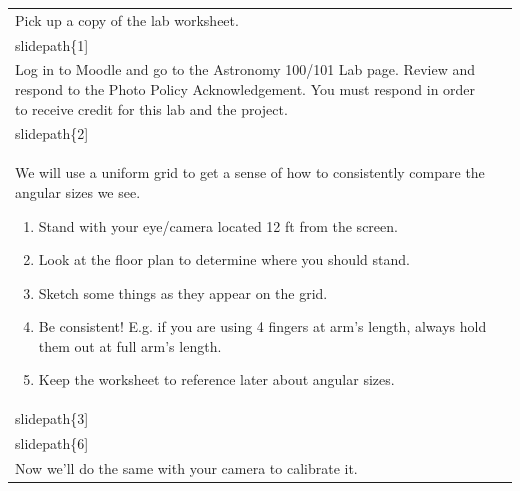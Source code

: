 \documentclass[12pt]{article}
\begin{document}
\begin{longtable}{|m{}|m{}|}\hline
Pick up a copy of the lab worksheet. & \texttt{[image: \\slidepath\{1]}}\\\hline
Log in to Moodle and go to the Astronomy 100/101 Lab page. Review and respond to the Photo Policy Acknowledgement. You must respond in order to receive credit for this lab and the project.& \texttt{[image: \\slidepath\{2]}}\\\hline
We will use a uniform grid to get a sense of how to consistently compare the angular sizes we see. 

\begin{enumerate}
\item Stand with your eye/camera located 12 ft from the screen. 
\item Look at the floor plan to determine where you should stand. 
\item Sketch some things as they appear on the grid. 
\item Be consistent! E.g. if you are using 4 fingers at arm's length, always hold them out at full arm's length. 
\item Keep the worksheet to reference later about angular sizes.
\end{enumerate} & \texttt{[image: \\slidepath\{3]}}

\texttt{[image: \\slidepath\{6]}}\\\hline
Now we'll do the same with your camera to calibrate it.


\end{longtable}
\end{document}
